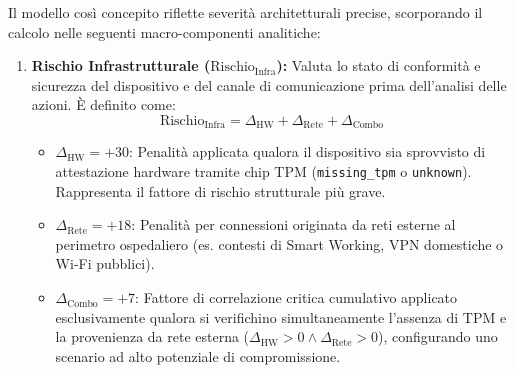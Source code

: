 Il modello così concepito riflette severità architetturali precise, scorporando il calcolo nelle seguenti macro-componenti analitiche:

\begin{enumerate}
    \item \textbf{Rischio Infrastrutturale ($\text{Rischio}_{\text{Infra}}$):} Valuta lo stato di conformità e sicurezza del dispositivo e del canale di comunicazione prima dell'analisi delle azioni. È definito come:
    \begin{equation}
        \text{Rischio}_{\text{Infra}} = \Delta_{\text{HW}} + \Delta_{\text{Rete}} + \Delta_{\text{Combo}}
    \end{equation}
    \begin{itemize}
        \item $\Delta_{\text{HW}} = +30$: Penalità applicata qualora il dispositivo sia sprovvisto di attestazione hardware tramite chip TPM (\texttt{missing\_tpm} o \texttt{unknown}). Rappresenta il fattore di rischio strutturale più grave.
        \item $\Delta_{\text{Rete}} = +18$: Penalità per connessioni originata da reti esterne al perimetro ospedaliero (es. contesti di Smart Working, VPN domestiche o Wi-Fi pubblici).
        \item $\Delta_{\text{Combo}} = +7$: Fattore di correlazione critica cumulativo applicato esclusivamente qualora si verifichino simultaneamente l'assenza di TPM e la provenienza da rete esterna ($\Delta_{\text{HW}} > 0 \land \Delta_{\text{Rete}} > 0$), configurando uno scenario ad alto potenziale di compromissione.
    \end{itemize}


\end{enumerate}
